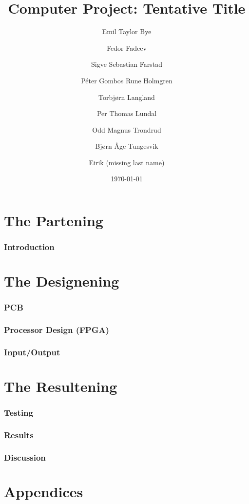 \documentclass{report}
\title{Computer Project: Tentative Title}
\date{\today}
\author{Emil Taylor Bye
     \and Fedor Fadeev
     \and Sigve Sebastian Farstad
     \and Péter Gombos Rune Holmgren
     \and Torbjørn Langland
     \and Per Thomas Lundal
     \and Odd Magnus Trondrud
     \and Bjørn Åge Tungesvik
     \and Eirik (missing last name)
}
\begin{document}
\maketitle

\begin{abstract}
	
\end{abstract}

\tableofcontents

\part{The Partening}

\section{Introduction}
	


\part{The Designening}

\section{PCB}
	

\section{Processor Design (FPGA)}
	

\section{Input/Output}
	

\part{The Resultening}

\section{Testing}
	

\section{Results}
	

\section{Discussion}
	

\part{Appendices}
	



\nocite{*}
\end{document}
